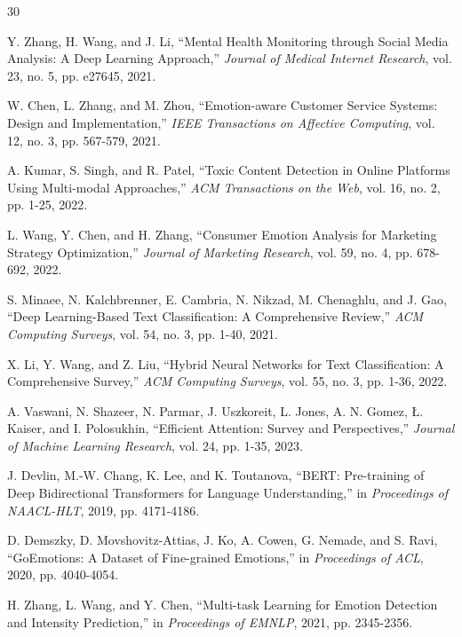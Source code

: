 \documentclass[12pt,a4paper]{article}
\begin{document}

\begin{thebibliography}{30}

Y. Zhang, H. Wang, and J. Li, ``Mental Health Monitoring through Social Media Analysis: A Deep Learning Approach,'' \textit{Journal of Medical Internet Research}, vol. 23, no. 5, pp. e27645, 2021.

W. Chen, L. Zhang, and M. Zhou, ``Emotion-aware Customer Service Systems: Design and Implementation,'' \textit{IEEE Transactions on Affective Computing}, vol. 12, no. 3, pp. 567-579, 2021.

A. Kumar, S. Singh, and R. Patel, ``Toxic Content Detection in Online Platforms Using Multi-modal Approaches,'' \textit{ACM Transactions on the Web}, vol. 16, no. 2, pp. 1-25, 2022.

L. Wang, Y. Chen, and H. Zhang, ``Consumer Emotion Analysis for Marketing Strategy Optimization,'' \textit{Journal of Marketing Research}, vol. 59, no. 4, pp. 678-692, 2022.

S. Minaee, N. Kalchbrenner, E. Cambria, N. Nikzad, M. Chenaghlu, and J. Gao, ``Deep Learning-Based Text Classification: A Comprehensive Review,'' \textit{ACM Computing Surveys}, vol. 54, no. 3, pp. 1-40, 2021.

X. Li, Y. Wang, and Z. Liu, ``Hybrid Neural Networks for Text Classification: A Comprehensive Survey,'' \textit{ACM Computing Surveys}, vol. 55, no. 3, pp. 1-36, 2022.

A. Vaswani, N. Shazeer, N. Parmar, J. Uszkoreit, L. Jones, A. N. Gomez, Ł. Kaiser, and I. Polosukhin, ``Efficient Attention: Survey and Perspectives,'' \textit{Journal of Machine Learning Research}, vol. 24, pp. 1-35, 2023.

J. Devlin, M.-W. Chang, K. Lee, and K. Toutanova, ``BERT: Pre-training of Deep Bidirectional Transformers for Language Understanding,'' in \textit{Proceedings of NAACL-HLT}, 2019, pp. 4171-4186.

D. Demszky, D. Movshovitz-Attias, J. Ko, A. Cowen, G. Nemade, and S. Ravi, ``GoEmotions: A Dataset of Fine-grained Emotions,'' in \textit{Proceedings of ACL}, 2020, pp. 4040-4054.

H. Zhang, L. Wang, and Y. Chen, ``Multi-task Learning for Emotion Detection and Intensity Prediction,'' in \textit{Proceedings of EMNLP}, 2021, pp. 2345-2356.


\end{thebibliography}
\end{document}
